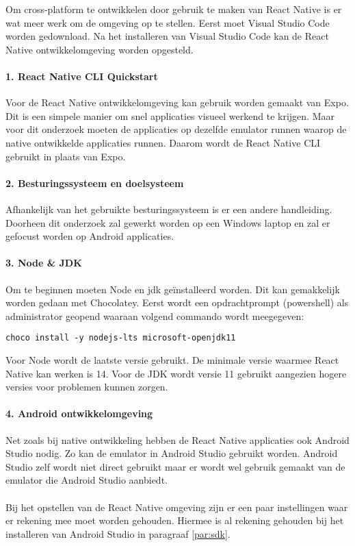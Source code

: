 Om cross-platform te ontwikkelen door gebruik te maken van React Native is er wat meer werk om 
de omgeving op te stellen. Eerst moet Visual Studio Code worden gedownload. 
Na het installeren van Visual Studio Code kan de React Native ontwikkelomgeving worden opgesteld. 

\paragraph{1. React Native CLI Quickstart}
Voor de React Native ontwikkelomgeving kan gebruik worden gemaakt van Expo. 
Dit is een simpele manier om snel applicaties visueel werkend te krijgen. 
Maar voor dit onderzoek moeten de applicaties op dezelfde emulator runnen waarop de native 
ontwikkelde applicaties runnen. Daarom wordt de React Native CLI gebruikt in plaats van Expo.

\paragraph{2. Besturingssysteem en doelsysteem}
Afhankelijk van het gebruikte besturingssysteem is er een andere handleiding. 
Doorheen dit onderzoek zal gewerkt worden op een Windows laptop en zal er gefocust worden op 
Android applicaties.

\paragraph{3. Node \& JDK}
Om te beginnen moeten \Gls{Node} en \acrshort{jdk} geïnstalleerd worden. Dit kan gemakkelijk 
worden gedaan met \Gls{Chocolatey}. Eerst wordt een 
opdrachtprompt (powershell) als administrator geopend waaraan volgend commando wordt meegegeven:
\begin{verbatim}
choco install -y nodejs-lts microsoft-openjdk11
\end{verbatim}
Voor Node wordt de laatste versie gebruikt. De minimale versie waarmee React Native kan werken is 14. 
Voor de JDK wordt versie 11 gebruikt aangezien hogere versies voor problemen kunnen zorgen.

\paragraph{4. Android ontwikkelomgeving}
Net zoals bij native ontwikkeling hebben de React Native applicaties ook Android Studio nodig. 
Zo kan de emulator in Android Studio gebruikt worden. 
Android Studio zelf wordt niet direct gebruikt maar er wordt wel gebruik gemaakt van de 
emulator die Android Studio aanbiedt.
\\\\
Bij het opstellen van de React Native omgeving zijn er een paar instellingen waar er rekening 
mee moet worden gehouden. Hiermee is al rekening gehouden bij het installeren van Android Studio 
in paragraaf \ref{par:sdk}.

